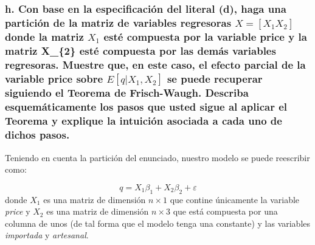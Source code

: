 \documentclass[
]{article}
\begin{document}
\hypertarget{h.-con-base-en-la-especificaciuxf3n-del-literal-d-haga-una-particiuxf3n-de-la-matriz-de-variables-regresoras-x-x_1x_2-donde-la-matriz-x_1-estuxe9-compuesta-por-la-variable-price-y-la-matriz-x_2-estuxe9-compuesta-por-las-demuxe1s-variables-regresoras.-muestre-que-en-este-caso-el-efecto-parcial-de-la-variable-price-sobre-eqx_1x_2-se-puede-recuperar-siguiendo-el-teorema-de-frisch-waugh.-describa-esquemuxe1ticamente-los-pasos-que-usted-sigue-al-aplicar-el-teorema-y-explique-la-intuiciuxf3n-asociada-a-cada-uno-de-dichos-pasos.}{%
\subsubsection{\texorpdfstring{h. Con base en la especificación del
literal (d), haga una partición de la matriz de variables regresoras
\(X = [X_{1}X_{2}]\) donde la matriz \(X_{1}\) esté compuesta por la
variable price y la matriz X\_\{2\} esté compuesta por las demás
variables regresoras. Muestre que, en este caso, el efecto parcial de la
variable price sobre \(E[q|X_{1},X_{2}]\) se puede recuperar siguiendo
el Teorema de Frisch-Waugh. Describa esquemáticamente los pasos que
usted sigue al aplicar el Teorema y explique la intuición asociada a
cada uno de dichos
pasos.}{h. Con base en la especificación del literal (d), haga una partición de la matriz de variables regresoras X = {[}X\_\{1\}X\_\{2\}{]} donde la matriz X\_\{1\} esté compuesta por la variable price y la matriz X\_\{2\} esté compuesta por las demás variables regresoras. Muestre que, en este caso, el efecto parcial de la variable price sobre E{[}q\textbar X\_\{1\},X\_\{2\}{]} se puede recuperar siguiendo el Teorema de Frisch-Waugh. Describa esquemáticamente los pasos que usted sigue al aplicar el Teorema y explique la intuición asociada a cada uno de dichos pasos.}}\label{h.-con-base-en-la-especificaciuxf3n-del-literal-d-haga-una-particiuxf3n-de-la-matriz-de-variables-regresoras-x-x_1x_2-donde-la-matriz-x_1-estuxe9-compuesta-por-la-variable-price-y-la-matriz-x_2-estuxe9-compuesta-por-las-demuxe1s-variables-regresoras.-muestre-que-en-este-caso-el-efecto-parcial-de-la-variable-price-sobre-eqx_1x_2-se-puede-recuperar-siguiendo-el-teorema-de-frisch-waugh.-describa-esquemuxe1ticamente-los-pasos-que-usted-sigue-al-aplicar-el-teorema-y-explique-la-intuiciuxf3n-asociada-a-cada-uno-de-dichos-pasos.}}

Teniendo en cuenta la partición del enunciado, nuestro modelo se puede
reescribir como:

\[
{q}= X_{1}\beta_{1}+X_{2}\beta_{2}+\varepsilon 
\] donde \(X_{1}\) es una matriz de dimensión \(n\times1\) que contine
únicamente la variable \emph{price} y \(X_{2}\) es una matriz de
dimensión \(n\times3\) que está compuesta por una columna de unos (de
tal forma que el modelo tenga una constante) y las variables
\emph{importada} y \emph{artesanal}.
\end{document}
